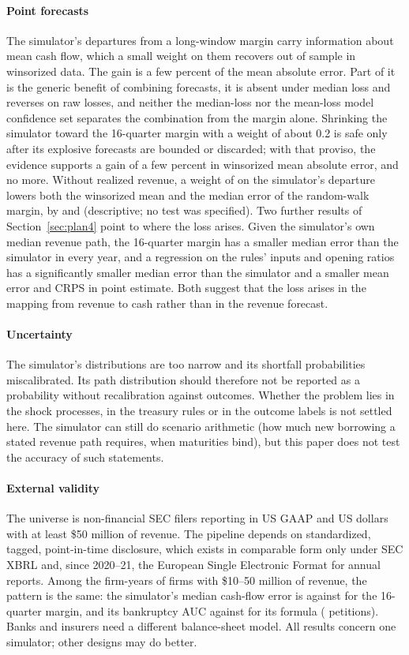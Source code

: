 \documentclass[preprint,12pt,authoryear]{elsarticle}
\begin{document}
\paragraph{Point forecasts} The simulator's departures from a long-window margin carry information about mean cash flow, which a small weight on them recovers out of sample in winsorized data. The gain is a few percent of the mean absolute error. Part of it is the generic benefit of combining forecasts, it is absent under median loss and reverses on raw losses, and neither the median-loss nor the mean-loss model confidence set separates the combination from the margin alone. Shrinking the simulator toward the 16-quarter margin with a weight of about 0.2 is safe only after its explosive forecasts are bounded or discarded; with that proviso, the evidence supports a gain of a few percent in winsorized mean absolute error, and no more. Without realized revenue, a weight of \PUncW{} on the simulator's departure lowers both the winsorized mean and the median error of the random-walk margin, by \PUncGainW{} and \PUncGainMed{} (descriptive; no test was specified). Two further results of Section~\ref{sec:plan4} point to where the loss arises. Given the simulator's own median revenue path, the 16-quarter margin has a smaller median error than the simulator in every year, and a regression on the rules' inputs and opening ratios has a significantly smaller median error than the simulator and a smaller mean error and CRPS in point estimate. Both suggest that the loss arises in the mapping from revenue to cash rather than in the revenue forecast.

\paragraph{Uncertainty} The simulator's distributions are too narrow and its shortfall probabilities miscalibrated. Its path distribution should therefore not be reported as a probability without recalibration against outcomes. Whether the problem lies in the shock processes, in the treasury rules or in the outcome labels is not settled here. The simulator can still do scenario arithmetic (how much new borrowing a stated revenue path requires, when maturities bind), but this paper does not test the accuracy of such statements.

\paragraph{External validity} The universe is non-financial SEC filers reporting in US GAAP and US dollars with at least \$50 million of revenue. The pipeline depends on standardized, tagged, point-in-time disclosure, which exists in comparable form only under SEC XBRL and, since 2020--21, the European Single Electronic Format for annual reports. Among the \SmallN{} firm-years of firms with \$10--50 million of revenue, the pattern is the same: the simulator's median cash-flow error is \SmallMaeTwin{} against \SmallMaeSixteen{} for the 16-quarter margin, and its bankruptcy AUC \SmallAucTwin{} against \SmallAucFormula{} for its formula (\SmallBk{} petitions). Banks and insurers need a different balance-sheet model. All results concern one simulator; other designs may do better.
\end{document}
